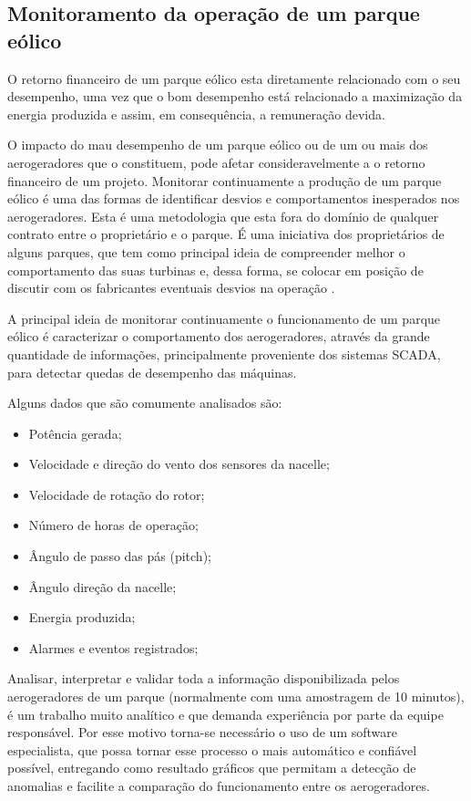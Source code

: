 \subsection{Monitoramento da operação de um parque eólico }
\label{Sec:monitoramentoDeUmParqueEolico}

O retorno financeiro de um parque eólico esta diretamente relacionado com o seu desempenho, uma vez que o bom desempenho está relacionado a maximização da energia produzida e assim, em consequência, a remuneração devida.

O impacto do mau desempenho de um parque eólico ou de um ou mais dos aerogeradores que o constituem, pode afetar consideravelmente a o retorno financeiro de um projeto. Monitorar continuamente a produção de um parque eólico é uma das formas de identificar desvios e comportamentos inesperados nos aerogeradores. Esta é uma metodologia que esta fora do domínio de qualquer contrato entre o proprietário e o parque. É uma iniciativa dos proprietários de alguns parques, que tem como principal ideia de compreender melhor o comportamento das suas turbinas e, dessa forma, se colocar em posição de discutir com os fabricantes eventuais desvios na operação \cite{metodologia-avaliacao-desempenho-de-parques}.

A principal ideia de monitorar continuamente o funcionamento de um parque eólico é caracterizar o comportamento dos aerogeradores, através da grande quantidade de informações, principalmente proveniente dos sistemas SCADA, para detectar quedas de desempenho das máquinas.

Alguns dados que são comumente analisados são:
\begin{itemize}
    \item Potência gerada;
    \item Velocidade e direção do vento dos sensores da nacelle;
    \item Velocidade de rotação do rotor;
    \item Número de horas de operação;
    \item Ângulo de passo das pás (pitch);
    \item Ângulo direção da nacelle;
    \item Energia produzida;
    \item Alarmes e eventos registrados;
\end{itemize}

Analisar, interpretar e validar toda a informação disponibilizada pelos aerogeradores de um parque (normalmente com uma amostragem de 10 minutos), é um trabalho muito analítico e que demanda experiência por parte da equipe responsável. Por esse motivo torna-se necessário o uso de um software especialista, que possa tornar esse processo o mais automático e confiável possível, entregando como resultado gráficos que permitam a detecção de anomalias e facilite a comparação do funcionamento entre os aerogeradores.

